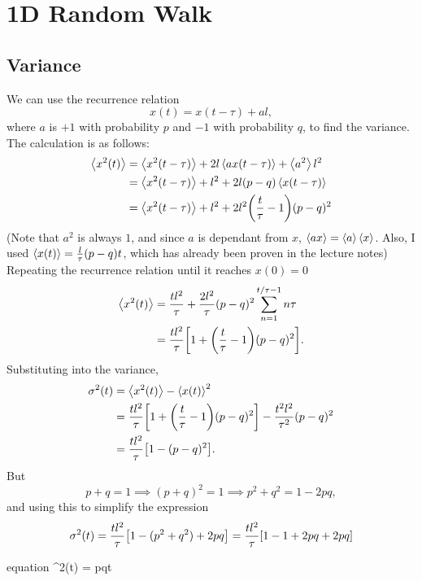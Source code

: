 \documentclass[12pt,a4paper]{article}
\begin{document}
	\section{1D Random Walk}
	\subsection{Variance}
	We can use the recurrence relation
	\begin{equation}
		x(t) = x(t-\tau) + al,
	\end{equation}
	where $a$ is $+1$ with probability $p$ and $-1$ with probability $q$, to find the variance.
	The calculation is as follows:
	\begin{align}
		\expval{x^2(t)} &= \expval{x^2(t-\tau)} + 2l\expval{ax(t-\tau)} + \expval{a^2}l^2 \\
		&= \expval{x^2(t-\tau)} + l^2 + 2l(p - q)\expval{x(t-\tau)} \\
		&= \expval{x^2(t-\tau)} + l^2 + 2l^2\qty(\frac{t}{\tau}-1)(p - q)^2
	\end{align}
	(Note that $a^2$ is always $1$, and since $a$ is dependant from $x$, $\expval{ax} = \expval{a}\expval{x}$.
	Also, I used $\expval{x(t)} = \frac{l}{\tau}(p-q)t$, which has already been proven in the lecture notes) \\
	Repeating the recurrence relation until it reaches $x(0) = 0$
	\begin{align}
		\expval{x^2(t)} &= \frac{tl^2}{\tau} + \frac{2l^2}{\tau}(p - q)^2 \sum_{n=1}^{t/\tau - 1} n\tau \\
		&= \frac{tl^2}{\tau}\qty[1 + \qty(\frac{t}{\tau} - 1)(p - q)^2].
	\end{align}
	Substituting into the variance,
	\begin{align}
		\sigma^2(t) &= \expval{x^2(t)} - \expval{x(t)}^2 \\
		&= \frac{tl^2}{\tau}\qty[1 + \qty(\frac{t}{\tau} - 1)(p - q)^2] - \frac{t^2l^2}{\tau^2}(p-q)^2 \\
		&= \frac{tl^2}{\tau}\qty[1 - (p - q)^2].
	\end{align}
	But
	\begin{equation}
		p+q = 1 \implies (p+q)^2 = 1 \implies p^2 + q^2 = 1 - 2pq,
	\end{equation}
	and using this to simplify the expression
	\begin{equation}
		\sigma^2(t) = \frac{tl^2}{\tau}\qty[1 - (p^2 + q^2) + 2pq] = \frac{tl^2}{\tau}\qty[1 - 1 + 2pq + 2pq]
	\end{equation}
	\begin{empheq}[box=\fbox]{equation}
		\sigma^2(t) = pqt
	\end{empheq}
\end{document}
